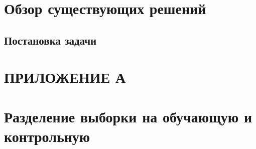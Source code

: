 \section{Обзор существующих решений}

\subsection{Постановка задачи}

\section*{ПРИЛОЖЕНИЕ А}

\section{Разделение выборки на обучающую и контрольную}
